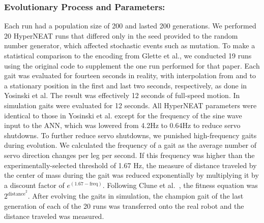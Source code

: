 
\subsubsection{Evolutionary Process and Parameters:}

Each run had a population size of 200 and lasted 200 generations. We performed 20 HyperNEAT runs that differed only in the seed provided to the random number generator, which affected stochastic events such as mutation. To make a statistical comparison to the encoding from Glette et al., we conducted 19 runs using the original code to supplement the one run performed for that paper. 
Each gait was evaluated for fourteen seconds in reality, with interpolation from and to a stationary position in the first and last two seconds, respectively, as done in Yosinski et al. The result was effectively 12 seconds of full-speed
motion. In simulation gaits were evaluated for 12 seconds. 
All HyperNEAT parameters were identical to those in Yosinski et al. except for the frequency of the sine wave input to the ANN, which was lowered from 4.2Hz to 0.64Hz to reduce servo shutdowns. 
To further reduce servo shutdowns, we punished high-frequency gaits during evolution. We calculated the frequency of a gait as the average number of servo direction changes per leg per second. If this frequency was higher than the experimentally-selected threshold of 1.67 Hz, the measure of distance traveled by the center of mass during the gait was reduced exponentially by multiplying it by a discount factor of $e^{(1.67-\mathrm{freq})}$. Following Clune et al.~\cite{clune2009evolving}, the fitness equation was $2^{\mathrm{distance}^{2}}$. After evolving the gaits in simulation, the champion gait of the last generation of each of the 20 runs was transferred onto the real robot and the distance traveled was measured. 

